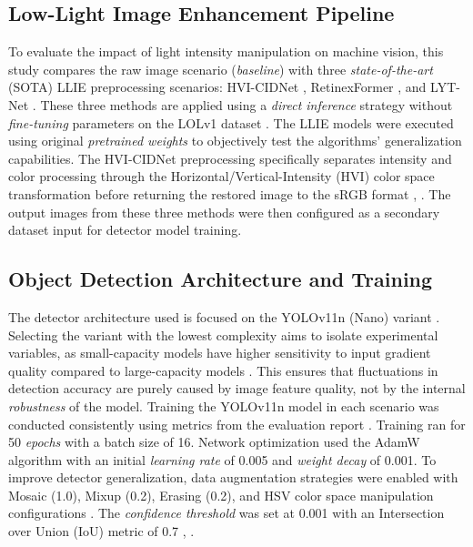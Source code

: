 \documentclass[conference]{IEEEtran}
\begin{document}
\subsection{Low-Light Image Enhancement Pipeline} To evaluate the impact of light intensity manipulation on machine vision, this study compares the raw image scenario (\textit{baseline}) with three \textit{state-of-the-art} (SOTA) LLIE preprocessing scenarios: HVI-CIDNet \cite{yan2025hvi}, RetinexFormer \cite{cai2023retinexformer}, and LYT-Net \cite{brateanu2025lytnet}.
These three methods are applied using a \textit{direct inference} strategy without \textit{fine-tuning} parameters on the LOLv1 dataset \cite{proposal2026sempro}. The LLIE models were executed using original \textit{pretrained weights} to objectively test the algorithms' generalization capabilities. The HVI-CIDNet preprocessing specifically separates intensity and color processing through the Horizontal/Vertical-Intensity (HVI) color space transformation before returning the restored image to the sRGB format \cite{yan2025hvi}, \cite{proposal2026sempro}. The output images from these three methods were then configured as a secondary dataset input for detector model training.

\subsection{Object Detection Architecture and Training} The detector architecture used is focused on the YOLOv11n (Nano) variant \cite{khanam2024yolov11}. Selecting the variant with the lowest complexity aims to isolate experimental variables, as small-capacity models have higher sensitivity to input gradient quality compared to large-capacity models \cite{proposal2026sempro}. This ensures that fluctuations in detection accuracy are purely caused by image feature quality, not by the internal \textit{robustness} of the model.
Training the YOLOv11n model in each scenario was conducted consistently using metrics from the evaluation report \cite{report2026internal}. Training ran for 50 \textit{epochs} with a batch size of 16. Network optimization used the AdamW algorithm with an initial \textit{learning rate} of 0.005 and \textit{weight decay} of 0.001. To improve detector generalization, data augmentation strategies were enabled with Mosaic (1.0), Mixup (0.2), Erasing (0.2), and HSV color space manipulation configurations \cite{report2026internal}. The \textit{confidence threshold} was set at 0.001 with an Intersection over Union (IoU) metric of 0.7 \cite{report2026internal}, \cite{metrics2026formulas}.
\end{document}
